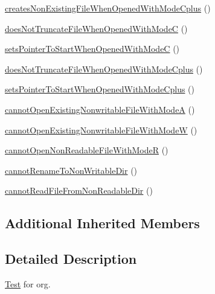 \begin{DoxyCompactItemize}
\item 
\mbox{\hyperlink{classorg_1_1bovigo_1_1vfs_1_1vfs_stream_wrapper_file_test_case_a1aa2e6e62900ee38a8b5660c1e071309}{creates\+Non\+Existing\+File\+When\+Opened\+With\+Mode\+Cplus}} ()
\item 
\mbox{\hyperlink{classorg_1_1bovigo_1_1vfs_1_1vfs_stream_wrapper_file_test_case_a2758c25f988d9e1ecf0a4f10b0fb6dec}{does\+Not\+Truncate\+File\+When\+Opened\+With\+ModeC}} ()
\item 
\mbox{\hyperlink{classorg_1_1bovigo_1_1vfs_1_1vfs_stream_wrapper_file_test_case_a66475dba00b66ba30c57c63a56bbe5ba}{sets\+Pointer\+To\+Start\+When\+Opened\+With\+ModeC}} ()
\item 
\mbox{\hyperlink{classorg_1_1bovigo_1_1vfs_1_1vfs_stream_wrapper_file_test_case_aacb6ed945761040dacc207738dbaa1f7}{does\+Not\+Truncate\+File\+When\+Opened\+With\+Mode\+Cplus}} ()
\item 
\mbox{\hyperlink{classorg_1_1bovigo_1_1vfs_1_1vfs_stream_wrapper_file_test_case_a54341817f2370bee5f3c1d959a87e4a7}{sets\+Pointer\+To\+Start\+When\+Opened\+With\+Mode\+Cplus}} ()
\item 
\mbox{\hyperlink{classorg_1_1bovigo_1_1vfs_1_1vfs_stream_wrapper_file_test_case_a0d346f51feef102c2e8d6ff8b113dd1d}{cannot\+Open\+Existing\+Nonwritable\+File\+With\+ModeA}} ()
\item 
\mbox{\hyperlink{classorg_1_1bovigo_1_1vfs_1_1vfs_stream_wrapper_file_test_case_a4756aac986a8706f083f661f759a7e07}{cannot\+Open\+Existing\+Nonwritable\+File\+With\+ModeW}} ()
\item 
\mbox{\hyperlink{classorg_1_1bovigo_1_1vfs_1_1vfs_stream_wrapper_file_test_case_a7bf743132fb2c286e3b07a4a674c6537}{cannot\+Open\+Non\+Readable\+File\+With\+ModeR}} ()
\item 
\mbox{\hyperlink{classorg_1_1bovigo_1_1vfs_1_1vfs_stream_wrapper_file_test_case_ac7547c54599ef9ff0ea96ff3e241c1dd}{cannot\+Rename\+To\+Non\+Writable\+Dir}} ()
\item 
\mbox{\hyperlink{classorg_1_1bovigo_1_1vfs_1_1vfs_stream_wrapper_file_test_case_a03e7c33f56dee49bf19d813df10e7c45}{cannot\+Read\+File\+From\+Non\+Readable\+Dir}} ()
\end{DoxyCompactItemize}
\subsection*{Additional Inherited Members}


\subsection{Detailed Description}
\mbox{\hyperlink{class_test}{Test}} for org. 

